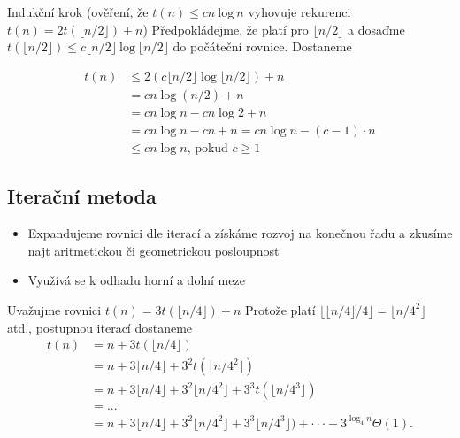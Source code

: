 \documentclass{szzclass}
\begin{document}
Indukční krok
(ověření, že $t(n) \leq cn~\text{log}~n$ vyhovuje rekurenci $t(n) = 2t(\lfloor n/2 \rfloor) + n$)
Předpokládejme, že platí pro $\lfloor n/2 \rfloor$ a dosaďme
$t(\lfloor n/2 \rfloor) \leq c \lfloor n/2 \rfloor~\text{log}~ \lfloor n/2 \rfloor$ do počáteční rovnice. Dostaneme



\begin{align*}
t(n) &\leq 2(c \lfloor n/2 \rfloor \log{\lfloor n/2 \rfloor}) + n\\
     &= cn \log{(n/2)} + n\\
     &= cn \log{ n} - cn \log{} 2 + n\\
     &= cn \log{ n} - cn + n = cn \log{ n} - (c - 1)\cdot n\\
     &\leq cn\log{n}\text{, pokud }c \geq 1
\end{align*}



\subsection{Iterační metoda}

\begin{itemize}
    \item Expandujeme rovnici dle iterací a získáme rozvoj na konečnou řadu a zkusíme najt aritmetickou či geometrickou posloupnost
    \item Využívá se k odhadu horní a dolní meze
\end{itemize}

Uvažujme rovnici
$t(n) = 3t(\lfloor n/4\rfloor) + n$
Protože platí $\lfloor \lfloor n/4\rfloor /4\rfloor = \lfloor n/4^2 \rfloor$
atd., postupnou iterací dostaneme
\begin{align*}
t(n) &= n + 3t(\lfloor n/4 \rfloor)\\
     &= n + 3 \lfloor n/4\rfloor + 3^2t(\lfloor n/4^2 \rfloor)\\
     &= n + 3 \lfloor n/4 \rfloor + 3^2\lfloor n/4^2 \rfloor + 3^3t(\lfloor n/4^3 \rfloor)\\
     &= . . .\\
     &= n + 3 \lfloor n/4\rfloor + 3^2 \lfloor n/4^2 \rfloor + 3^3 \lfloor n/4^3 \rfloor) + · · · + 3^{\log_4 n} \Theta(1).
\end{align*}
\end{document}
